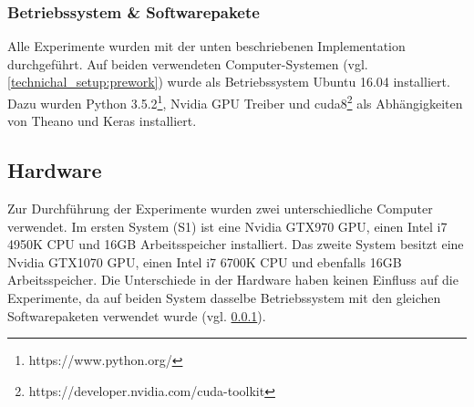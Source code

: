 \subsubsection{Betriebssystem \& Softwarepakete}
\label{technical_setup:software}
Alle Experimente wurden mit der unten beschriebenen Implementation durchgeführt. Auf beiden verwendeten Computer-Systemen (vgl. \ref{technichal_setup:prework}) wurde als Betriebssystem Ubuntu 16.04 installiert. Dazu wurden Python 3.5.2\footnote{https://www.python.org/}, Nvidia GPU Treiber und cuda8\footnote{https://developer.nvidia.com/cuda-toolkit} als Abhängigkeiten von Theano und Keras installiert.

\subsection{Hardware}
\label{technichal_setup:hardware}
Zur Durchführung der Experimente wurden zwei unterschiedliche Computer verwendet. Im ersten System (S1) ist eine Nvidia GTX970 GPU, einen Intel i7 4950K CPU und 16GB Arbeitsspeicher installiert. Das zweite System besitzt eine Nvidia GTX1070 GPU, einen Intel i7 6700K CPU und ebenfalls 16GB Arbeitsspeicher. Die Unterschiede in der Hardware haben keinen Einfluss auf die Experimente, da auf beiden System dasselbe Betriebssystem mit den gleichen Softwarepaketen verwendet wurde (vgl. \ref{technical_setup:software}).

